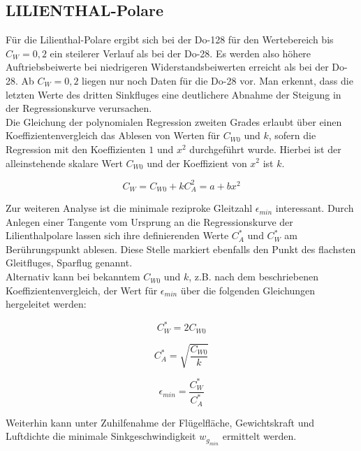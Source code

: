 \subsection{LILIENTHAL-Polare}
Für die Lilienthal-Polare ergibt sich bei der Do-128 für den Wertebereich bis $C_{W} = 0,2$ ein steilerer Verlauf als bei der Do-28. Es werden also höhere Auftriebsbeiwerte bei niedrigeren Widerstandsbeiwerten erreicht als bei der Do-28.
Ab $C_{W} = 0,2$ liegen nur noch Daten für die Do-28 vor. Man erkennt, dass die letzten Werte des dritten Sinkfluges eine deutlichere Abnahme der Steigung in der Regressionskurve verursachen.\\
Die Gleichung der polynomialen Regression zweiten Grades erlaubt über einen Koeffizientenvergleich das Ablesen von Werten für $C_{W0}$ und $k$, sofern die Regression mit den Koeffizienten $1$ und $x^{2}$ durchgeführt wurde. Hierbei ist der alleinstehende skalare Wert $C_{W0}$ und der Koeffizient von $x^{2}$ ist $k$.

\begin{equation*}
C_{W} = C_{W0} + k C_{A}^{2} = a + b x^{2}
\end{equation*}

\vspace{5mm}
\noindent Zur weiteren Analyse ist die minimale reziproke Gleitzahl $\epsilon_{min}$ interessant. Durch Anlegen einer Tangente vom Ursprung an die Regressionskurve der Lilienthalpolare lassen sich ihre definierenden Werte $C_{A}^{*}$ und $C_{W}^{*}$ am Berührungspunkt ablesen. Diese Stelle markiert ebenfalls den Punkt des flachsten Gleitfluges, Sparflug genannt.\\
Alternativ kann bei bekanntem $C_{W0}$ und $k$, z.B. nach dem beschriebenen Koeffizientenvergleich, der Wert für $\epsilon_{min}$ über die folgenden Gleichungen hergeleitet werden:

\begin{equation*}
C_{W}^{*} = 2 C_{W0}
\end{equation*}

\begin{equation*}
C_{A}^{*} = \sqrt{\frac{C_{W0}}{k}}
\end{equation*}

\begin{equation*}
\epsilon_{min} = \frac{C_{W}^{*}}{C_{A}^{*}}
\end{equation*}

\vspace{5mm}
\noindent Weiterhin kann unter Zuhilfenahme der Flügelfläche, Gewichtskraft und Luftdichte die minimale Sinkgeschwindigkeit $w_{g_{min}}$ ermittelt werden.\\

